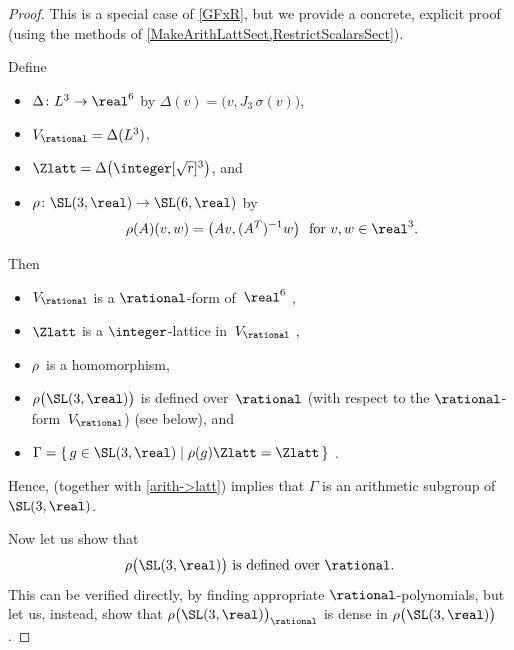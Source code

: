 \begin{proof}
  This is a special case of
\cref{GFxR}, but we
provide a concrete, explicit proof (using the
methods of \cref{MakeArithLattSect,RestrictScalarsSect}).

Define
\noprelistbreak
 \begin{itemize}
 \item $\Delta \colon L^3 \to \real^6$ by $\Delta(v) =
\bigl( v,J_3 \, \sigma(v) \bigr)$,
 \item $V_{\rational} = \Delta(L^3)$,
 \item $\Zlatt = \Delta \bigl( \integer[\sqrt{r}]^3
\bigr)$, and
 \item $\rho \colon \SL(3,\real) \to \SL(6,\real)$ by
	$$ \text{$\rho(A)(v,w) = \bigl( Av, (A^T)^{-1}w \bigr)$ 
	\ for $v,w \in \real^3$} .$$
 \end{itemize}
 Then 
 \begin{itemize}
 \item $V_{\rational}$ is a $\rational$-form of~$\real^6$
,
 \item $\Zlatt$ is a $\integer$-lattice
in~$V_{\rational}$ ,  
 \item $\rho$~is a homomorphism, 
 \item $\rho \bigl( \SL(3,\real) \bigr)$ is defined
over~$\rational$ (with respect to the
$\rational$-form~$V_{\rational}$)
(see  below), %
and
 \item $\Gamma = \{\, g \in \SL(3,\real) \mid \rho(g)
\Zlatt = \Zlatt \,\} $ .
 \end{itemize}
 Hence,  (together with
\cref{arith->latt}) implies that $\Gamma$ is an
arithmetic subgroup of $\SL(3,\real)$.

Now let us show that 
 \begin{equation} \label{NoncocpctInSL3Eg-/Q}
 \mbox{$\rho \bigl( \SL(3,\real) \bigr)$ is defined
over~$\rational$.}
 \end{equation}
 This can be verified directly, by finding appropriate
$\rational$-polynomials, but let us, instead,
show that $\rho \bigl( \SL(3,\real) \bigr)_{\rational}$ is
dense in $\rho \bigl( \SL(3,\real) \bigr)$.


\end{proof}
